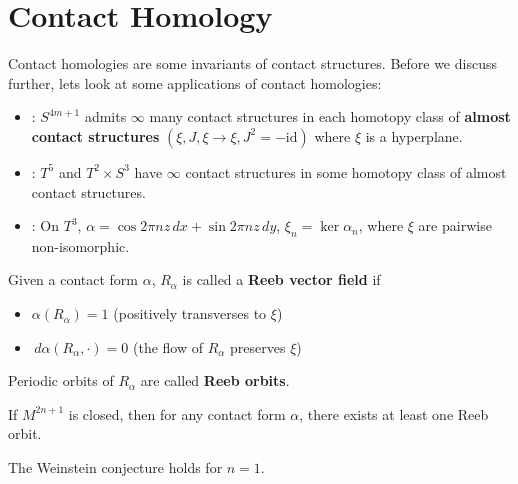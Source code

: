 \section{Contact Homology}

Contact homologies are some invariants of contact structures. Before we discuss further, lets look at some applications of contact homologies:

\begin{itemize}
\item \text{[Ustilovsky, 1999]}: $S^{4m+1}$ admits $\infty$ many contact structures in each homotopy class of \textbf{almost contact structures} $(\xi, J, \xi\to \xi, J^2 = -\text{id})$ where $\xi$ is a hyperplane.
\item \text{[Bourgeois, 2004]}: $T^5$ and $T^2 \times S^3$ have $\infty$ contact structures in some homotopy class of almost contact structures.
\item {}: On $T^3$, $\alpha = \cos 2\pi n z\,dx + \sin 2\pi n z \,dy$, $\xi_n = \ker \alpha_n$, where $\xi$ are pairwise non-isomorphic.
\end{itemize}

\begin{definition}

Given a contact form $\alpha$, $R_\alpha$ is called a \textbf{Reeb vector field} if
\begin{itemize}
\item $\alpha(R_\alpha)=1$ (positively transverses to $\xi$)
\item $\,d\alpha(R_\alpha, \cdot)=0$ (the flow of $R_\alpha$ preserves $\xi$)
\end{itemize}

\end{definition}

\begin{definition}

Periodic orbits of $R_\alpha$ are called \textbf{Reeb orbits}.

\end{definition}

\begin{conjecture}

If $M^{2n+1}$ is closed, then for any contact form $\alpha$, there exists at least one Reeb orbit.

\end{conjecture}

\begin{theorem}
[Taubes, 2007]

The Weinstein conjecture holds for $n=1$.

\end{theorem}

